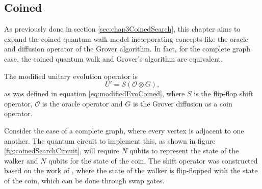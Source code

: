 \documentclass[../../dissertation.tex]{subfiles}
\begin{document}
\subsection{Coined}
As previously done in section \ref{sec:chap3CoinedSearch}, this chapter aims to expand the coined quantum walk model incorporating concepts like the oracle and diffusion operator of the Grover algorithm. In fact, for the complete graph case, the coined quantum walk and Grover's algorithm are equivalent.\par
The modified unitary evolution operator is
\begin{equation}
        U' = S (\mathcal{O} \otimes G),\label{eq:modifiedEvoCoinedQiskit}
\end{equation}
as was defined in equation \ref{eq:modifiedEvoCoined}, where $S$ is the flip-flop shift operator, $\mathcal{O}$ is the oracle operator and $G$ is the Grover diffusion as a coin operator.\par
Consider the case of a complete graph, where every vertex is adjacent to one another. The quantum circuit to implement this, as shown in figure \ref{fig:coinedSearchCircuit}, will require $N$ qubits to represent the state of the walker and $N$ qubits for the state of the coin.  The shift operator was constructed based on the work of \cite{douglaswang07}, where the state of the walker is flip-flopped with the state of the coin, which can be done through swap gates.
\end{document}
